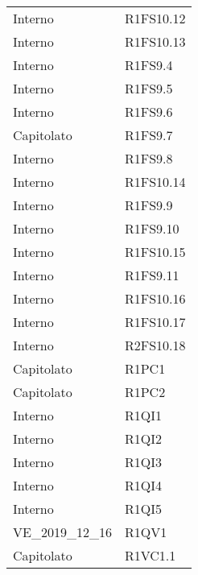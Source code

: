 {\begin{longtable}{ C{4cm} C{4cm}}
Interno & R1FS10.12\\

Interno & R1FS10.13\\

Interno & R1FS9.4\\

Interno & R1FS9.5\\

Interno & R1FS9.6\\

Capitolato & R1FS9.7\\

Interno & R1FS9.8\\


Interno & R1FS10.14\\

Interno & R1FS9.9\\

Interno & R1FS9.10\\

Interno & R1FS10.15\\

Interno & R1FS9.11\\

Interno & R1FS10.16\\

Interno & R1FS10.17\\

Interno & R2FS10.18\\


Capitolato & R1PC1\\

Capitolato & R1PC2\\


Interno & R1QI1\\

Interno & R1QI2\\

Interno & R1QI3\\

Interno & R1QI4\\

Interno & R1QI5\\

VE\_2019\_12\_16 & R1QV1\\


Capitolato & R1VC1.1\\


\end{longtable}}
